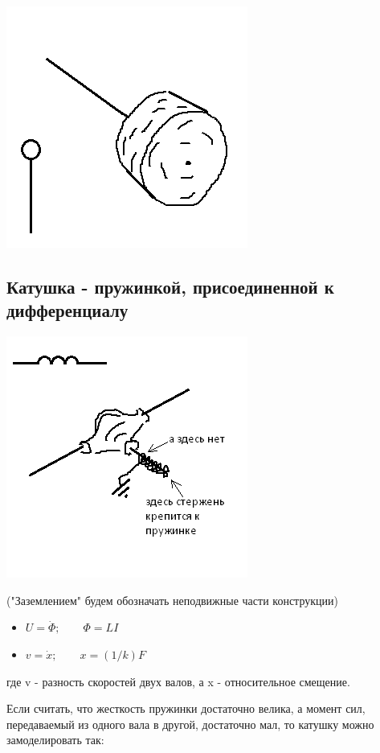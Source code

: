 \documentclass[11pt]{article} %
\begin{document}
\includegraphics{../C1.png}

\subsection{Катушка - пружинкой, присоединенной к дифференциалу}

\includegraphics{../L_rot.png}

("Заземлением" будем обозначать неподвижные части конструкции)

\begin{itemize}
\item $U=\dot \Phi; \qquad \Phi=LI$
\item $v=\dot x; \qquad x=(1/k)F$
\end{itemize}

где v - разность скоростей двух валов, а x - относительное смещение.

Если считать, что жесткость пружинки достаточно велика, а момент сил, передаваемый из одного вала в другой, достаточно мал, то катушку можно замоделировать так: 
\end{document}

